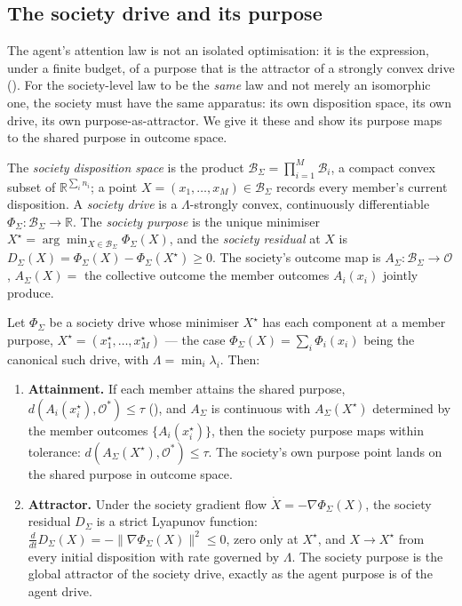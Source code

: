 \documentclass[11pt,twocolumn,a4paper]{article}
\newcommand{\R}{\mathbb{R}}
\newcommand{\Beh}{\mathcal{B}}       %
\newcommand{\drive}{\Phi}            %
\newcommand{\lam}{\lambda}
\newcommand{\Purp}{x^{\star}}        %
\newcommand{\Soc}{\Sigma}            %
\newcommand{\Out}{\mathcal{O}}       %
\newcommand{\tol}{\tau}
\newcommand{\norm}[1]{\lVert#1\rVert}
\newcommand{\dist}{d}
\begin{document}
\subsection{The society drive and its purpose}
\label{sec:society-drive}

The agent's attention law is not an isolated optimisation: it is the
expression, under a finite budget, of a purpose that is the attractor of a
strongly convex drive (). For the society-level law to be
the \emph{same} law and not merely an isomorphic one, the society must have
the same apparatus: its own disposition space, its own drive, its own
purpose-as-attractor. We give it these and show its purpose maps to the
shared purpose in outcome space.

\begin{definition}
\label{def:society-drive}
The \emph{society disposition space} is the product
$\Beh_\Soc=\prod_{i=1}^M\Beh_i$, a compact convex subset of
$\R^{\sum_i n_i}$; a point $X=(x_1,\dots,x_M)\in\Beh_\Soc$ records every
member's current disposition. A \emph{society drive} is a
$\Lambda$-strongly convex, continuously differentiable
$\drive_\Soc:\Beh_\Soc\to\R$. The \emph{society purpose} is the unique
minimiser $X^\star=\arg\min_{X\in\Beh_\Soc}\drive_\Soc(X)$, and the
\emph{society residual} at $X$ is
$D_\Soc(X)=\drive_\Soc(X)-\drive_\Soc(X^\star)\ge0$. The society's outcome
map is $A_\Soc:\Beh_\Soc\to\Out$, $A_\Soc(X)=$ the collective outcome the
member outcomes $A_i(x_i)$ jointly produce.
\end{definition}

\begin{proposition}
\label{prop:society-purpose}
Let $\drive_\Soc$ be a society drive whose minimiser $X^\star$ has each
component at a member purpose, $X^\star=(\Purp_1,\dots,\Purp_M)$ --- the case
$\drive_\Soc(X)=\sum_i\drive_i(x_i)$ being the canonical such drive, with
$\Lambda=\min_i\lam_i$. Then:
\begin{enumerate}[label=\textup{(\roman*)},leftmargin=2.2em]
\item \textbf{Attainment.} If each member attains the shared purpose,
$\dist(A_i(\Purp_i),\Out^\ast)\le\tol$ (), and $A_\Soc$ is
continuous with $A_\Soc(X^\star)$ determined by the member outcomes
$\{A_i(\Purp_i)\}$, then the society purpose maps within tolerance:
$\dist(A_\Soc(X^\star),\Out^\ast)\le\tol$. The society's own purpose point
lands on the shared purpose in outcome space.
\item \textbf{Attractor.} Under the society gradient flow
$\dot X=-\nabla\drive_\Soc(X)$, the society residual $D_\Soc$ is a strict
Lyapunov function: $\frac{d}{dt}D_\Soc(X)=-\norm{\nabla\drive_\Soc(X)}^2\le0$,
zero only at $X^\star$, and $X\to X^\star$ from every initial disposition
with rate governed by $\Lambda$. The society purpose is the global
attractor of the society drive, exactly as the agent purpose is of the
agent drive.
\end{enumerate}
\end{proposition}
\end{document}
